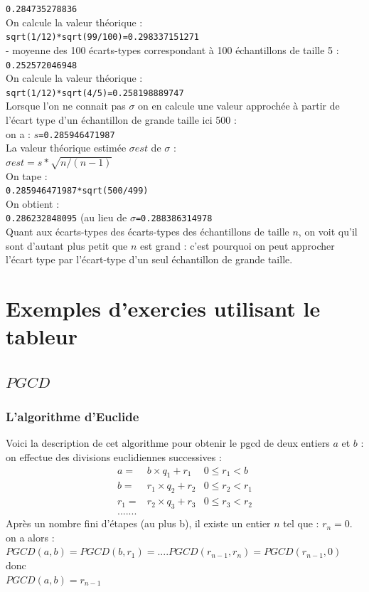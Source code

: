\documentclass[a4paper,11pt]{book}
\begin{document}
{\tt 0.284735278836}\\
On calcule la valeur th\'eorique :\\
{\tt sqrt(1/12)*sqrt(99/100)=0.298337151271}\\
- moyenne des 100 \'ecarts-types correspondant \`a 100 \'echantillons de taille 5 :\\
{\tt 0.252572046948}\\
On calcule la valeur th\'eorique :\\
{\tt sqrt(1/12)*sqrt(4/5)=0.258198889747}\\
Lorsque l'on ne connait pas $\sigma$ on en calcule une valeur approch\'ee 
\`a partir de l'\'ecart type d'un \'echantillon de grande taille ici 500 :\\
 on a : $s${\tt =0.285946471987}\\
La valeur th\'eorique estim\'ee $\sigma est$ de $\sigma$ :\\
$\sigma est=s*\sqrt{n/(n-1)}$\\
On tape :\\
{\tt 0.285946471987*sqrt(500/499)}\\
On obtient :\\
{\tt 0.286232848095} (au lieu de  $\sigma${\tt =0.288386314978}\\
Quant aux \'ecarts-types des \'ecarts-types des \'echantillons de taille $n$,
on voit qu'il sont d'autant plus petit que $n$ est grand : c'est pourquoi on 
peut approcher l'\'ecart type par l'\'ecart-type d'un seul \'echantillon de 
grande taille. \\

\chapter{Exemples d'exercies utilisant le tableur}
\section{$PGCD$} \label{sec:pgcd}
\subsection{L'algorithme d'Euclide}
Voici la description de cet algorithme pour obtenir le pgcd de deux entiers $a$ et $b$ :\\
on effectue des divisions euclidiennes successives :
\begin{eqnarray*}
a = &  b \times q_1+r_1   &  0 \leq r_1 < b \\
b  = & r_1 \times q_2+r_2  & 0 \leq r_2 < r_1 \\
r_1  = & r_2 \times q_3+r_3 & 0 \leq r_3 < r_2 \\
.......
\end{eqnarray*}
Apr\`es un nombre fini d'\'etapes (au plus b), il existe un entier $n$ tel que : 
$r_n = 0.$ \\
on a alors :\\
$PGCD(a,b )= PGCD(b,r_1) =....PGCD(r_{n-1},r_n) = PGCD(r_{n-1},0)$\\
donc \\
$PGCD(a,b ) = r_{n-1}$
\end{document}
